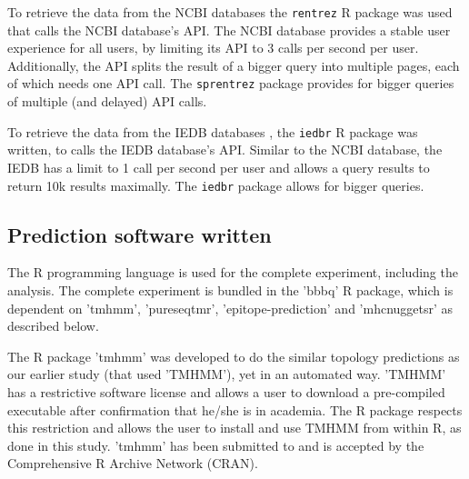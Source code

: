 
To retrieve the data from the NCBI databases the
\verb;rentrez; R package \cite{rentrez} was used
that calls the NCBI database's API. 
The NCBI database provides a stable user experience for all users, 
by limiting its API to 3 calls per second per user.
Additionally, the API splits the result of a bigger
query into multiple pages, each of which needs one API call.
The \verb;sprentrez; package \cite{sprentrez} provides for 
bigger queries of multiple (and delayed) API calls.


To retrieve the data from the IEDB  databases \cite{vita2019immune}, 
the \verb;iedbr; R package \cite{iedbr} was written,
to calls the IEDB database's API. 
Similar to the NCBI database,
the IEDB has a limit to 1 call per second per user
and allows a query results to return 10k results maximally.
The \verb;iedbr; package \cite{iedbr} allows for bigger queries.

\clearpage

\subsection{Prediction software written}

The R programming language is used for the complete 
experiment, including the analysis.
The complete experiment is bundled in the 'bbbq' R package,
which is dependent on 'tmhmm', 'pureseqtmr', 
'epitope-prediction' and 'mhcnuggetsr'
as described below.


The R package 'tmhmm' was developed to do the similar topology
predictions as our earlier study (that used 'TMHMM'), yet in an automated way.
'TMHMM' has a restrictive software license \cite{krogh2001predicting} 
and allows a user
to download a pre-compiled executable after confirmation that he/she
is in academia. The R package respects this restriction
and allows the user to install and use TMHMM from within R,
as done in this study.
'tmhmm' has been submitted to and is accepted 
by the Comprehensive R Archive Network (CRAN).

